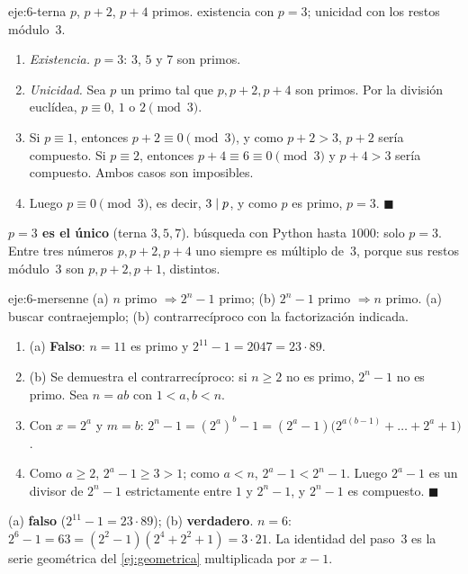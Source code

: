 \begin{solucion}{eje:6-terna}
\datos $p$, $p+2$, $p+4$ primos.
\planteamiento existencia con $p=3$; unicidad con los restos módulo~3.
\pasos
\begin{enumerate}[label=\arabic*.]
  \item \emph{Existencia.} $p=3$: $3$, $5$ y $7$ son primos.
  \item \emph{Unicidad.} Sea $p$ un primo tal que $p,p+2,p+4$ son primos. Por la división euclídea, $p\equiv 0$, $1$ o $2\pmod 3$.
  \item Si $p\equiv 1$, entonces $p+2\equiv 0\pmod 3$, y como $p+2>3$, $p+2$ sería compuesto. Si $p\equiv 2$, entonces $p+4\equiv 6\equiv 0\pmod 3$ y $p+4>3$ sería compuesto. Ambos casos son imposibles.
  \item Luego $p\equiv 0\pmod 3$, es decir, $3\mid p$, y como $p$ es primo, $p=3$. $\blacksquare$
\end{enumerate}
\resultado \textbf{$p=3$ es el único} (terna $3,5,7$).
\comprobacion búsqueda con Python hasta $1000$: solo $p=3$. Entre tres números $p,p+2,p+4$ uno siempre es múltiplo de~3, porque sus restos módulo~3 son $p,p+2,p+1$, distintos.
\end{solucion}

\begin{solucion}{eje:6-mersenne}
\datos (a) $n$ primo $\Rightarrow 2^{n}-1$ primo; (b) $2^{n}-1$ primo $\Rightarrow n$ primo.
\planteamiento (a) buscar contraejemplo; (b) contrarrecíproco con la factorización indicada.
\pasos
\begin{enumerate}[label=\arabic*.]
  \item (a) \textbf{Falso}: $n=11$ es primo y $2^{11}-1=2047=23\cdot 89$.
  \item (b) Se demuestra el contrarrecíproco: si $n\ge 2$ no es primo, $2^{n}-1$ no es primo. Sea $n=ab$ con $1<a,b<n$.
  \item Con $x=2^{a}$ y $m=b$: $2^{n}-1=(2^{a})^{b}-1=(2^{a}-1)\bigl(2^{a(b-1)}+\dots+2^{a}+1\bigr)$.
  \item Como $a\ge 2$, $2^{a}-1\ge 3>1$; como $a<n$, $2^{a}-1<2^{n}-1$. Luego $2^{a}-1$ es un divisor de $2^{n}-1$ estrictamente entre $1$ y $2^{n}-1$, y $2^{n}-1$ es compuesto. $\blacksquare$
\end{enumerate}
\resultado (a) \textbf{falso} ($2^{11}-1=23\cdot 89$); (b) \textbf{verdadero}.
\comprobacion $n=6$: $2^{6}-1=63=(2^{2}-1)(2^{4}+2^{2}+1)=3\cdot 21$. La identidad del paso~3 es la serie geométrica del \cref{ej:geometrica} multiplicada por $x-1$.
\end{solucion}

